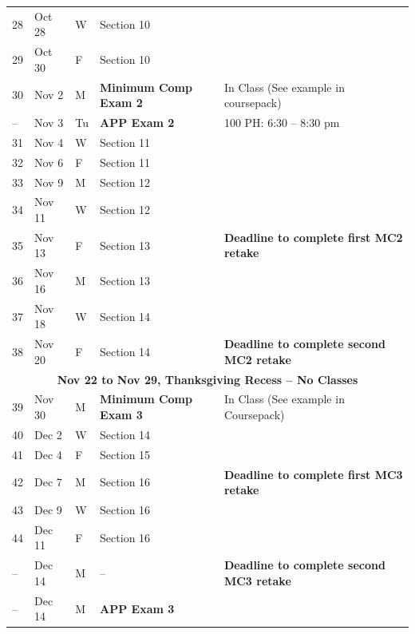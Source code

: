 \documentclass[11pt,article,oneside]{memoir}
\begin{document}
\begin{small}
\begin{tabular}{lllll}
28 & Oct 28 & W & Section 10 & \\
29 & Oct 30 & F & Section 10 & \\
30 & Nov 2 & M & \textbf{Minimum Comp Exam 2} & In Class (See example in coursepack) \\
-- & Nov 3 & Tu & \textbf{APP Exam 2} & 100 PH: 6:30 -- 8:30 pm \\
31 & Nov 4 & W & Section 11 & \\
32 & Nov 6 & F & Section 11 & \\
33 & Nov 9 & M & Section 12 & \\
34 & Nov 11 & W & Section 12 & \\
35 & Nov 13 & F & Section 13 & \textbf{Deadline to complete first MC2 retake} \\
36 & Nov 16 & M & Section 13 & \\
37 & Nov 18 & W & Section 14 & \\
38 & Nov 20 & F & Section 14 & \textbf{Deadline to complete second MC2 retake} \\
\multicolumn{5}{c}{\textbf{Nov 22 to Nov 29, Thanksgiving Recess -- No Classes}} \\
39 & Nov 30 & M & \textbf{Minimum Comp Exam 3} & In Class (See example in Coursepack) \\
40 & Dec 2 & W & Section 14 & \\
41 & Dec 4 & F & Section 15 & \\
42 & Dec 7 & M & Section 16 & \textbf{Deadline to complete first MC3 retake} \\
43 & Dec 9 & W & Section 16 & \\
44 & Dec 11 & F & Section 16 &  \\
-- & Dec 14 & M & -- & \textbf{Deadline to complete second MC3 retake} \\
-- & Dec 14 & M & \textbf{APP Exam 3} & \\
\bottomrule
\end{tabular}
\end{small}
\end{document}
